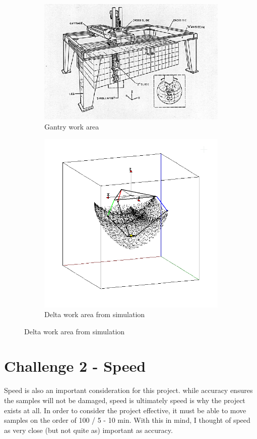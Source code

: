 \documentclass[11pt]{article}
\begin{document}
    \begin{figure}[H]
    \centering
    \begin{subfigure}{.5\textwidth}
      \centering
      \includegraphics[width=.7\linewidth]{gantry_workarea.jpg}
      \caption{Gantry work area}
      \label{fig:Gantry_Work}
    \end{subfigure}%
    \begin{subfigure}{.5\textwidth}
      \centering
      \includegraphics[width=.7\linewidth]{Delta_Workarea.png}
      \caption{Delta work area from simulation \cite{Delta_Sim}}
      \label{fig:Delta_Work}
    \end{subfigure}
    \label{fig:test}
    \end{figure}

\section{Challenge 2 - Speed}

Speed is also an important consideration for this project. while accuracy ensures the samples will not be damaged, speed is ultimately speed is why the project exists at all. In order to consider the project effective, it must be able to move samples on the order of 100 / 5 - 10 min. With this in mind, I thought of speed as very close (but not quite as) important as accuracy.  
\end{document}
